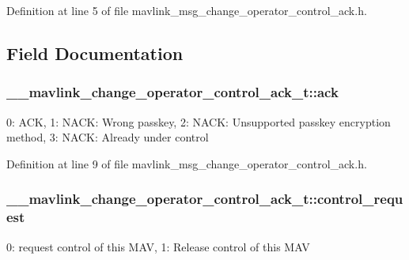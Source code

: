 Definition at line 5 of file mavlink\-\_\-msg\-\_\-change\-\_\-operator\-\_\-control\-\_\-ack.\-h.



\subsection{Field Documentation}
\hypertarget{struct____mavlink__change__operator__control__ack__t_a420017052e533270a67f82a663bc07fa}{
\subsubsection[{ack}]{ \-\_\-\-\_\-mavlink\-\_\-change\-\_\-operator\-\_\-control\-\_\-ack\-\_\-t\-::ack}}\label{struct____mavlink__change__operator__control__ack__t_a420017052e533270a67f82a663bc07fa}


0\-: A\-C\-K, 1\-: N\-A\-C\-K\-: Wrong passkey, 2\-: N\-A\-C\-K\-: Unsupported passkey encryption method, 3\-: N\-A\-C\-K\-: Already under control 



Definition at line 9 of file mavlink\-\_\-msg\-\_\-change\-\_\-operator\-\_\-control\-\_\-ack.\-h.

\hypertarget{struct____mavlink__change__operator__control__ack__t_a3b0abe5ae412967c3341c6e90f09d0d6}{
\subsubsection[{control\-\_\-request}]{ \-\_\-\-\_\-mavlink\-\_\-change\-\_\-operator\-\_\-control\-\_\-ack\-\_\-t\-::control\-\_\-request}}\label{struct____mavlink__change__operator__control__ack__t_a3b0abe5ae412967c3341c6e90f09d0d6}


0\-: request control of this M\-A\-V, 1\-: Release control of this M\-A\-V 



